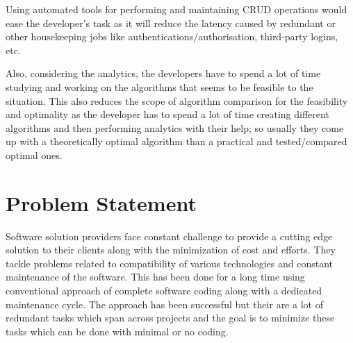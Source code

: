 \documentclass[a4paper]{report}
\begin{document}
    Using automated tools for performing and maintaining CRUD operations would ease the developer's task as it will reduce the latency caused by redundant or other housekeeping jobs like authentications/authorisation, third-party logins, etc.
    
    Also, considering the analytics, the developers have to spend a lot of time studying and working on the algorithms that seems to be feasible to the situation. This also reduces the scope of algorithm comparison for the feasibility and optimality as the developer has to spend a lot of time creating different algorithms and then performing analytics with their help; so usually they come up with a theoretically optimal algorithm than a practical and tested/compared optimal ones.
    \section{Problem Statement}
    Software solution providers face constant challenge to provide a cutting edge solution to their clients along with the minimization of cost and efforts. They tackle problems related to compatibility of various technologies and constant maintenance of the software. This has been done for a long time using conventional approach of complete software coding along with a dedicated maintenance cycle. The approach has been successful but their are a lot of redundant tasks which span across projects and the goal is to minimize these tasks which can be done with minimal or no coding.    
\end{document}
